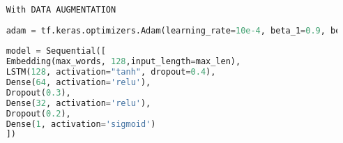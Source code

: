 \begin{lstlisting}[language=Python, label={lst:l11},caption=Seventh LSTM]
	
	With DATA AUGMENTATION
	
	adam = tf.keras.optimizers.Adam(learning_rate=10e-4, beta_1=0.9, beta_2=0.999, epsilon=1e-7)
	
	model = Sequential([
	Embedding(max_words, 128,input_length=max_len),
	LSTM(128, activation="tanh", dropout=0.4),
	Dense(64, activation='relu'),
	Dropout(0.3),
	Dense(32, activation='relu'),
	Dropout(0.2),
	Dense(1, activation='sigmoid')
	])
	
	
\end{lstlisting}
